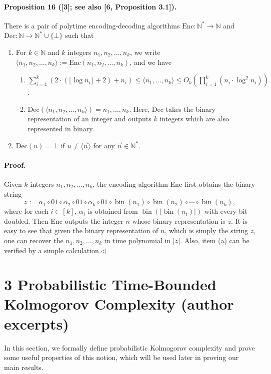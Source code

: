\documentclass[10pt,a4paper]{article}
\begin{document}
\paragraph{Proposition 16 ([3]; see also [6, Proposition 3.1]).} There is a pair of polytime encoding-decoding algorithms $\mathrm{Enc}:\mathbb N^*\to\mathbb N$ and $\mathrm{Dec}:\mathbb N\to\mathbb N^*\cup\{\bot\}$ such that
\begin{enumerate}
\item For $k\in\mathbb N$ and $k$ integers $n_1,n_2,\ldots,n_k$, we write $\langle n_1,n_2,\ldots,n_k\rangle:=\mathrm{Enc}(n_1,n_2,\ldots,n_k)$, and we have
\begin{enumerate}
\item $\sum_{i=1}^k(2\cdot(\lfloor\log n_i\rfloor+2)+n_i)\leq\langle n_1,\ldots,n_k\rangle\leq O_k(\prod_{i=1}^k(n_i\cdot\log^2n_i))$.
\item $\mathrm{Dec}(\langle n_1,n_2,\ldots,n_k\rangle)=n_1,\ldots,n_k$. Here, Dec takes the binary representation of an integer and outputs $k$ integers which are also represented in binary.
\end{enumerate}
\item $\mathrm{Dec}(u)=\bot$ if $u\neq\langle\vec n\rangle$ for any $\vec n\in\mathbb N^*$.
\end{enumerate}
\paragraph{Proof.} Given $k$ integers $n_1,n_2,\ldots,n_k$, the encoding algorithm Enc first obtains the binary string
\[z:=\alpha_1\circ01\circ\alpha_2\circ01\circ\alpha_k\circ01\circ\operatorname{bin}(n_1)\circ\operatorname{bin}(n_2)\circ\cdots\circ\operatorname{bin}(n_k),\]
where for each $i\in[k]$, $\alpha_i$ is obtained from $\operatorname{bin}(|\operatorname{bin}(n_i)|)$ with every bit doubled. Then Enc outputs the integer $n$ whose binary representation is $z$. It is easy to see that given the binary representation of $n$, which is simply the string $z$, one can recover the $n_1,n_2,\ldots,n_k$ in time polynomial in $|z|$. Also, item (a) can be verified by a simple calculation.\hfill$\triangleleft$
\section*{3 Probabilistic Time-Bounded Kolmogorov Complexity (author excerpts)}
In this section, we formally define probabilistic Kolmogorov complexity and prove some useful properties of this notion, which will be used later in proving our main results.
\end{document}

